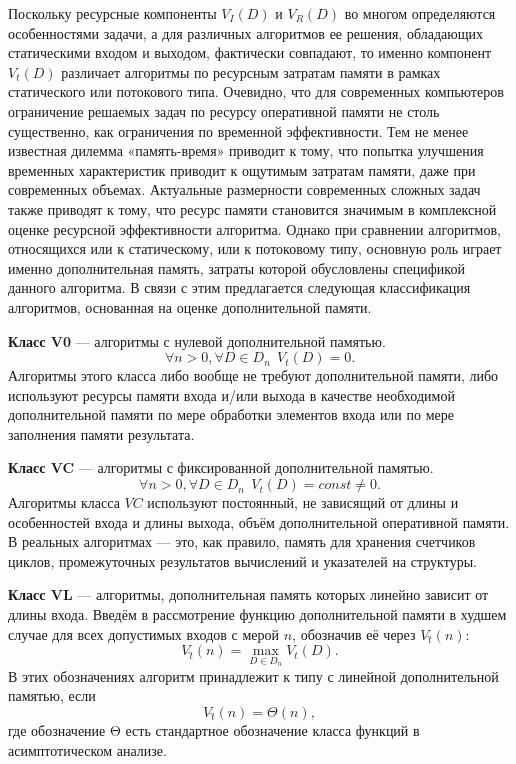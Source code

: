 Поскольку ресурсные компоненты $V_I(D)$ и $V_R(D)$ во многом определяются особенностями задачи, а для различных алгоритмов ее решения, обладающих статическими входом и выходом, фактически совпадают, то именно компонент $V_t(D)$ различает алгоритмы по ресурсным затратам памяти в рамках статического или потокового типа. Очевидно, что для современных компьютеров ограничение решаемых задач по ресурсу оперативной памяти не столь существенно, как ограничения по временной эффективности. Тем не менее известная дилемма «память-время» приводит к тому, что попытка улучшения временных характеристик приводит к ощутимым затратам памяти, даже при современных объемах. Актуальные размерности современных сложных задач также приводят к тому, что ресурс памяти становится значимым в комплексной оценке ресурсной эффективности алгоритма. Однако при сравнении алгоритмов, относящихся или к статическому, или к потоковому типу, основную роль играет именно дополнительная память, затраты которой обусловлены спецификой данного алгоритма. В связи с этим предлагается следующая классификация алгоритмов, основанная на оценке дополнительной памяти.~\cite{uljanov}

\textbf{Класс V0} --- алгоритмы с нулевой дополнительной памятью.
\begin{equation}
	\forall n > 0, \forall D \in D_n ~~V_t(D) = 0.
\end{equation}
Алгоритмы этого класса либо вообще не требуют дополнительной памяти, либо используют ресурсы памяти входа и/или выхода в качестве необходимой дополнительной памяти по мере обработки элементов входа или по мере заполнения памяти результата.~\cite{uljanov}

\textbf{Класс VC} --- алгоритмы с фиксированной дополнительной памятью.
\begin{equation}
	\forall n > 0, \forall D \in D_n ~~	V_t(D) = const \neq 0.
\end{equation}
Алгоритмы класса $VC$ используют постоянный, не зависящий от длины и особенностей входа и длины выхода, объём дополнительной оперативной памяти. В реальных алгоритмах --- это, как правило, память для хранения счетчиков циклов, промежуточных результатов вычислений и указателей на структуры.~\cite{uljanov}

\textbf{Класс VL} --- алгоритмы, дополнительная память которых линейно зависит от длины входа. Введём в рассмотрение функцию дополнительной памяти в худшем случае для всех допустимых входов с мерой $n$, обозначив её через $V\hat{_t}(n)$:
\begin{equation}
	V\hat{_t}(n) = \max_{D \in D_n}V_t(D).
\end{equation}
В этих обозначениях алгоритм принадлежит к типу с линейной дополнительной памятью, если
\begin{equation}
	V\hat{_t}(n) = \Theta(n),
\end{equation}
где обозначение Θ есть стандартное обозначение класса функций в асимптотическом анализе.~\cite{uljanov}


